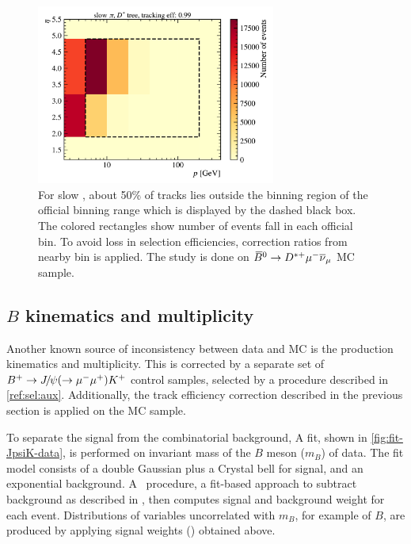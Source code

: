 \begin{figure}[htb]
    \centering
    \includegraphics[width=0.7\textwidth]{./figs-mc-correction/reweighting-tracking/Dst_spi_p_eta.pdf}
    \caption{
        For slow \pion, about 50\% of tracks lies outside the binning region
        of the official \trackcalib binning range which is displayed by the
        dashed black box.
        The colored rectangles show number of events fall in each
        official \trackcalib bin.
        To avoid loss in selection efficiencies,
        correction ratios from nearby bin is applied.
        The study is done on ${{\kern 0.18em\overline{\kern -0.18em B}}{}^0} \rightarrow {\ensuremath{{D}^{*+}}} {\ensuremath{\mu^-}} {\ensuremath{{\overline{\nu}}_\mu}}$ MC sample.
    }
    \label{fig:trackcalib-slow-pi}
\end{figure}


\subsection{$B$ kinematics and multiplicity}
\label{ref:mc-cor:init:jpsi-k}

Another known source of inconsistency between data and MC is the \B production
kinematics and multiplicity.
This is corrected by a separate set of
${{{B}^+}} \rightarrow {\ensuremath{{J\mskip -3mu/\mskip -2mu\psi}}} (\rightarrow {\ensuremath{\mu^-}}{\ensuremath{\mu^+}}) {{K}^+}$
control samples, selected by a procedure described
in \cref{ref:sel:aux}.
Additionally, the track efficiency correction described in the previous section
is applied on the \jpsi\kaon MC sample.

To separate the \jpsi\kaon signal from the combinatorial background,
A fit, shown in \cref{fig:fit-JpsiK-data},
is performed on invariant mass of the $B$ meson ($m_B$) of \jpsi\kaon data.
The fit model consists of a double Gaussian plus a Crystal bell for
signal, and an exponential background.
A \sPlot\ procedure,
a fit-based approach to subtract background as described in
\cite{Pivk_2005},
then computes signal and background weight for each event.
Distributions of variables uncorrelated with $m_B$, for example \pt of $B$,
are produced by applying signal weights (\sWeight) obtained above.


